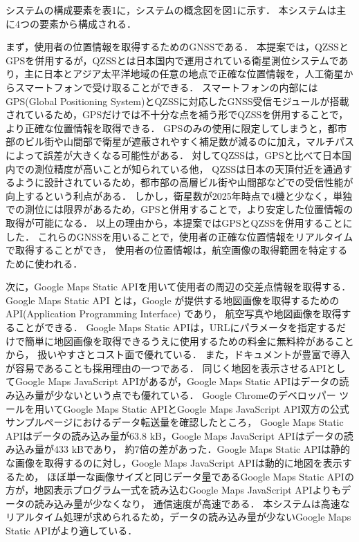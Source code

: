 \documentclass[uplatex,dvipdfmx]{jsarticle}
\begin{document}
システムの構成要素を表1に，システムの概念図を図1に示す．
本システムは主に4つの要素から構成される．

まず，使用者の位置情報を取得するためのGNSSである．
本提案では，QZSSとGPSを併用するが，QZSSとは日本国内で運用されている衛星測位システムであり，主に日本とアジア太平洋地域の任意の地点で正確な位置情報を，人工衛星からスマートフォンで受け取ることができる．
スマートフォンの内部にはGPS(Global Positioning System)とQZSSに対応したGNSS受信モジュールが搭載されているため，GPSだけでは不十分な点を補う形でQZSSを併用することで，より正確な位置情報を取得できる．
GPSのみの使用に限定してしまうと，都市部のビル街や山間部で衛星が遮蔽されやすく補足数が減るのに加え，マルチパスによって誤差が大きくなる可能性がある．
対してQZSSは，GPSと比べて日本国内での測位精度が高いことが知られている他，
QZSSは日本の天頂付近を通過するように設計されているため，都市部の高層ビル街や山間部などでの受信性能が向上するという利点がある\cite{ref:qzss}．
しかし，衛星数が2025年時点で4機と少なく，単独での測位には限界があるため，GPSと併用することで，より安定した位置情報の取得が可能になる．
以上の理由から，本提案ではGPSとQZSSを併用することにした．
これらのGNSSを用いることで，使用者の正確な位置情報をリアルタイムで取得することができ，
使用者の位置情報は，航空画像の取得範囲を特定するために使われる．

次に，Google Maps Static APIを用いて使用者の周辺の交差点情報を取得する．
Google Maps Static API とは，Google が提供する地図画像を取得するための API(Application Programming Interface) であり，
航空写真や地図画像を取得することができる．
Google Maps Static APIは，URLにパラメータを指定するだけで簡単に地図画像を取得できるうえに使用するための料金に無料枠があることから，
扱いやすさとコスト面で優れている．
また，ドキュメントが豊富で導入が容易であることも採用理由の一つである．
同じく地図を表示させるAPIとしてGoogle Maps JavaScript APIがあるが，Google Maps Static APIはデータの読み込み量が少ないという点でも優れている．
Google Chromeのデベロッパー ツールを用いてGoogle Maps Static APIとGoogle Maps JavaScript API双方の公式サンプルページにおけるデータ転送量を確認したところ，
Google Maps Static APIはデータの読み込み量が63.8 kB，Google Maps JavaScript APIはデータの読み込み量が433 kBであり，
約7倍の差があった\cite{ref:developer_static,ref:developer_js}．Google Maps Static APIは静的な画像を取得するのに対し，Google Maps JavaScript APIは動的に地図を表示するため，
ほぼ単一な画像サイズと同じデータ量であるGoogle Maps Static APIの方が，地図表示プログラム一式を読み込むGoogle Maps JavaScript APIよりもデータの読み込み量が少なくなり，
通信速度が高速である．
本システムは高速なリアルタイム処理が求められるため，データの読み込み量が少ないGoogle Maps Static APIがより適している．
\end{document}
